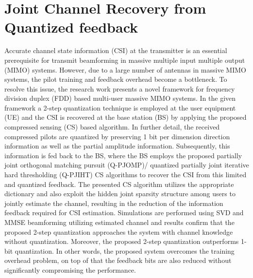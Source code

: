 \chapter{Joint Channel Recovery from Quantized feedback}
Accurate channel state information (CSI) at the transmitter is an essential prerequisite for transmit beamforming in massive multiple input multiple output (MIMO) systems. However, due to a large number of antennas in massive MIMO systems, the pilot training and feedback overhead become a bottleneck. To resolve this issue, the research work presents a novel framework for frequency division duplex (FDD) based multi-user massive MIMO systems. In the given framework a 2-step quantization technique is employed at the user equipment (UE) and the CSI is recovered at the base station (BS) by applying the proposed compressed sensing (CS) based algorithm. In further detail, the received compressed pilots are quantized by preserving 1 bit per dimension direction information as well as the partial amplitude information. Subsequently, this information is fed back to the BS, where the BS employs the proposed partially joint orthogonal matching pursuit (Q-PJOMP)/ quantized partially joint iterative hard thresholding (Q-PJIHT) CS algorithms to recover the CSI from this limited and quantized feedback. The presented CS algorithm utilizes the appropriate dictionary and also exploit the hidden joint sparsity structure among users to jointly estimate the channel, resulting in the reduction of the information feedback required for CSI estimation. Simulations are performed using SVD and MMSE beamforming utilizing estimated channel and results confirm that the proposed 2-step quantization approaches the system with channel knowledge without quantization. Moreover, the proposed 2-step quantization outperforms  1-bit quantization. In other words, the proposed system overcomes the training overhead problem, on top of that the feedback bits are also reduced without significantly compromising the performance.

